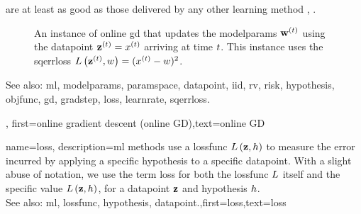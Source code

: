 {{are at least as good as those delivered by any other learning method \cite{HazanOCO}, \cite{GDOptimalRakhlin2012}. 
\begin{figure}[H]
	\begin{center}
\end{center} 
\caption{An instance of online \gls{gd} that updates the \gls{modelparams} ${\bf w}^{(t)}$ 
using the \gls{datapoint} ${\bf z}^{(t)} = x^{(t)}$ arriving at time $t$. 
This instance uses the \gls{sqerrloss} $L\left({\bf z}^{(t)},w \right) = (x^{(t)} - w)^{2}$.
}
\end{figure}
		See also: \gls{ml}, \gls{modelparams}, \gls{paramspace}, \gls{datapoint}, \gls{iid}, \gls{rv}, \gls{risk}, \gls{hypothesis}, \gls{objfunc}, \gls{gd}, \gls{gradstep}, \gls{loss}, \gls{learnrate}, \gls{sqerrloss}.},
first={online gradient descent (online GD)},text={online GD}}

	
{name={loss}, 
	description={\gls{ml} methods use a 
		\gls{lossfunc} $L\left({\bf z},h \right)$ to measure the error incurred 
		by applying a specific \gls{hypothesis} to a specific \gls{datapoint}. With a
		slight abuse of notation, we use the term loss for both the \gls{lossfunc} $L$ 
		itself and the specific value $L\left({\bf z},h \right)$, for a \gls{datapoint} ${\bf z}$ 
		and \gls{hypothesis} $h$.
				\\
		See also: \gls{ml}, \gls{lossfunc}, \gls{hypothesis}, \gls{datapoint}.},first={loss},text={loss} }

